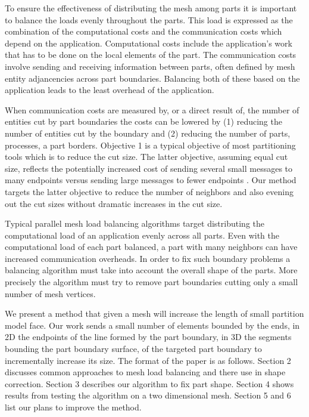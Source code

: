 \documentclass{thesis}
\begin{document}
To ensure the effectiveness of distributing the mesh among parts it is 
important to balance the loads evenly throughout the parts. This load is 
expressed as the combination of the computational costs and the communication 
costs which depend on the application. Computational costs include the 
application's work that has to be done on the local elements of the part. The 
communication costs involve sending and receiving information between parts, 
often defined by mesh entity adjancencies across part boundaries. Balancing 
both of these based on the application leads to the least overhead of the 
application.

When communication costs are measured by, or a direct result of, the number 
of entities cut by part boundaries the costs can be lowered by (1) reducing 
the number of entities cut by the boundary and (2) reducing the number of 
parts, processes, a part borders. Objective 1 is a typical objective of most 
partitioning tools which is to reduce the cut size. The latter objective, 
assuming equal cut size, reflects the potentially increased cost of sending 
several small messages to many endpoints versus sending large 
messages to fewer endpoints \cite{MPIpresent,MPImessage}. Our method targets 
the latter objective to reduce the number of neighbors and also evening out 
the cut sizes without dramatic increases in the cut size.

Typical parallel mesh load balancing algorithms target distributing the 
computational load of an application evenly across all parts. Even with the 
computational load of each part balanced, a part with many neighbors can have 
increased communication overheads. In order to fix such boundary problems a 
balancing algorithm must take into account the overall shape of the parts. 
More precisely the algorithm must try to remove part boundaries cutting only a 
small number of mesh vertices.

We present  a method that given a mesh will 
increase the length of small partition model face. Our work 
sends a small number of elements bounded by the ends, in 2D the endpoints of 
the line formed by the part boundary, in 3D the segments bounding the part 
boundary surface, of the targeted part boundary to incrementally increase its 
size. The format of the paper is as follows. Section 2 
discusses common approaches to mesh load balancing and there use in shape 
correction. Section 3 describes our algorithm to fix part shape. Section 4 
shows results from testing the algorithm on a two dimensional mesh. Section 5 
and 6 list our plans to improve the method. 
\end{document}
